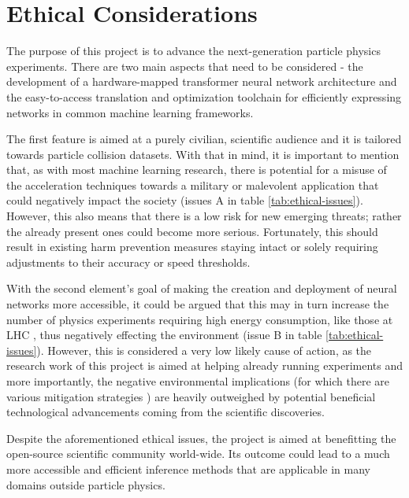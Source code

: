 \chapter{Ethical Considerations}\label{ethical}

The purpose of this project is to advance the next-generation particle physics experiments. There are two main aspects that need to be considered - the development of a hardware-mapped transformer neural network architecture and the easy-to-access translation and optimization toolchain for efficiently expressing networks in common machine learning frameworks.  

The first feature is aimed at a purely civilian, scientific audience and it is tailored towards particle collision datasets. With that in mind, it is important to mention that, as with most machine learning research, there is potential for a misuse of the acceleration techniques towards a military or malevolent application that could negatively impact the society (issues A in table \ref{tab:ethical-issues}). However, this also means that there is a low risk for new emerging threats; rather the already present ones could become more serious. Fortunately, this should result in existing harm prevention measures staying intact or solely requiring adjustments to their accuracy or speed thresholds.

With the second element's goal of making the creation and deployment of neural networks more accessible, it could be argued that this may in turn increase the number of physics experiments requiring high energy consumption, like those at LHC \cite{1-cernfacts}, thus negatively effecting the environment (issue B in table \ref{tab:ethical-issues}). However, this is considered a very low likely cause of action, as the research work of this project is aimed at helping already running experiments and more importantly, the negative environmental implications (for which there are various mitigation strategies \cite{Guida_2016, 2-capeans2017strategies}) are heavily outweighed by potential beneficial technological advancements coming from the scientific discoveries.

Despite the aforementioned ethical issues, the project is aimed at benefitting the open-source scientific community world-wide. Its outcome could lead to a much more accessible and efficient inference methods that are applicable in many domains outside particle physics.


